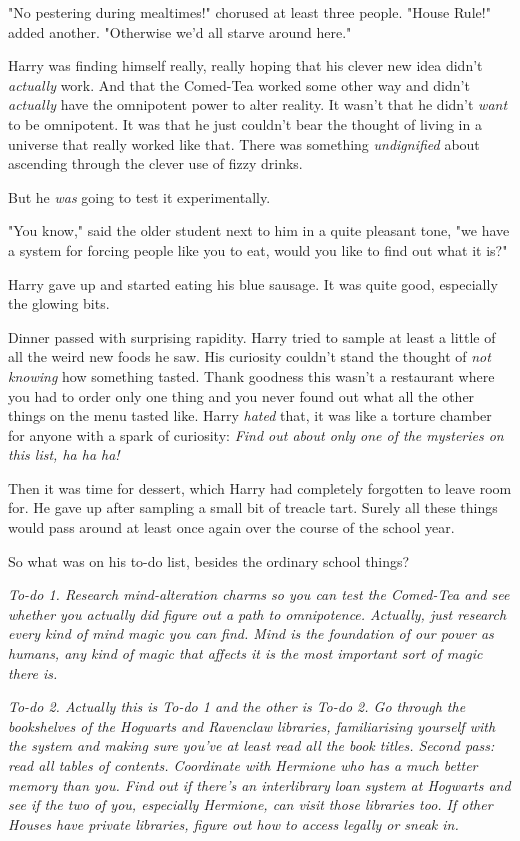 "No pestering during mealtimes!" chorused at least three people. "House Rule!" 
added another. "Otherwise we'd all starve around here."

Harry was finding himself really, really hoping that his clever new idea didn't 
\emph{actually} work. And that the Comed-Tea worked some other way and didn't 
\emph{actually} have the omnipotent power to alter reality. It wasn't that he 
didn't \emph{want} to be omnipotent. It was that he just couldn't bear the 
thought of living in a universe that really worked like that. There was 
something \emph{undignified} about ascending through the clever use of fizzy 
drinks.

But he \emph{was} going to test it experimentally.

"You know," said the older student next to him in a quite pleasant tone, "we 
have a system for forcing people like you to eat, would you like to find out 
what it is?"

Harry gave up and started eating his blue sausage. It was quite good, 
especially the glowing bits.

Dinner passed with surprising rapidity. Harry tried to sample at least a little 
of all the weird new foods he saw. His curiosity couldn't stand the thought of 
\emph{not knowing} how something tasted. Thank goodness this wasn't a 
restaurant where you had to order only one thing and you never found out what 
all the other things on the menu tasted like. Harry \emph{hated} that, it was 
like a torture chamber for anyone with a spark of curiosity: \emph{Find out 
about only one of the mysteries on this list, ha ha ha!}

Then it was time for dessert, which Harry had completely forgotten to leave 
room for. He gave up after sampling a small bit of treacle tart. Surely all 
these things would pass around at least once again over the course of the 
school year.

So what was on his to-do list, besides the ordinary school things?

\emph{To-do 1. Research mind-alteration charms so you can test the Comed-Tea 
and see whether you actually did figure out a path to omnipotence. Actually, 
just research every kind of mind magic you can find. Mind is the foundation of 
our power as humans, any kind of magic that affects it is the most important 
sort of magic there is.}

\emph{To-do 2. Actually this is To-do 1 and the other is To-do 2. Go through 
the bookshelves of the Hogwarts and Ravenclaw libraries, familiarising yourself 
with the system and making sure you've at least read all the book titles. 
Second pass: read all tables of contents. Coordinate with Hermione who has a 
much better memory than you. Find out if there's an interlibrary loan system at 
Hogwarts and see if the two of you, especially Hermione, can visit those 
libraries too. If other Houses have private libraries, figure out how to access 
legally or sneak in.}

